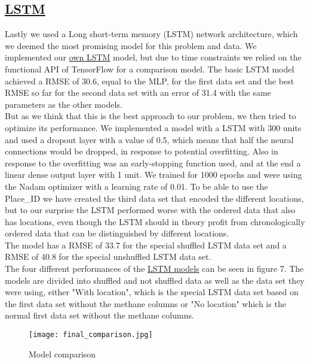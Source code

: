 \documentclass{article}
\begin{document}
\subsection{\href{https://github.com/tjayada/iANNwTF_Project/blob/main/model/10_finished_basic_LSTM_regression.ipynb}{LSTM}}
Lastly we used a Long short-term memory (LSTM) network architecture, which we deemed the most promising model for this problem and data. We implemented our \href{https://github.com/tjayada/iANNwTF_Project/blob/main/model/11_LSTM_own_implementation.ipynb}{own LSTM} model, but due to time constraints we relied on the functional API of TensorFlow for a comparison model.
The basic LSTM model achieved a RMSE of 30.6, equal to the MLP, for the first data set and the best RMSE so far for the second data set with an error of 31.4 with the same parameters as the other models. \\
But as we think that this is the best approach to our problem, we then tried to optimize its performance. We implemented a model with a LSTM with 300 units and used a dropout layer with a value of 0.5, which means that half the neural connections would be dropped, in response to potential overfitting. Also in response to the overfitting was an early-stopping function used, and at the end a linear dense output layer with 1 unit.
We trained for 1000 epochs and were using the Nadam optimizer with a learning rate of 0.01.
To be able to use the 
{\selectfont Place\_ID } 
we have created the third data set that encoded the different locations, but to our surprise the LSTM performed worse with the ordered data that also has locations, even though the LSTM should in theory profit from chronologically ordered data that can be distinguished by different locations. \\
The model has a RMSE of 33.7 for the special shuffled LSTM data set and a RMSE of 40.8 for the special unshuffled LSTM data set. \\
The four different performances of the \href{https://github.com/tjayada/iANNwTF_Project/tree/main/model/09_finished_LSTM_regression}{LSTM models} can be seen in figure 7. The models are divided into shuffled and not shuffled data as well as the data set they were using, either "With location", which is the special LSTM data set based on the first data set without the methane columns or "No location" which is the normal first data set without the methane columns.

\begin{figure}[htb!]
\centering
\texttt{[image: final\_comparison.jpg]}
\caption{Model comparison}
\label{fig:model_comparison}
\end{figure}
\newpage
\end{document}
